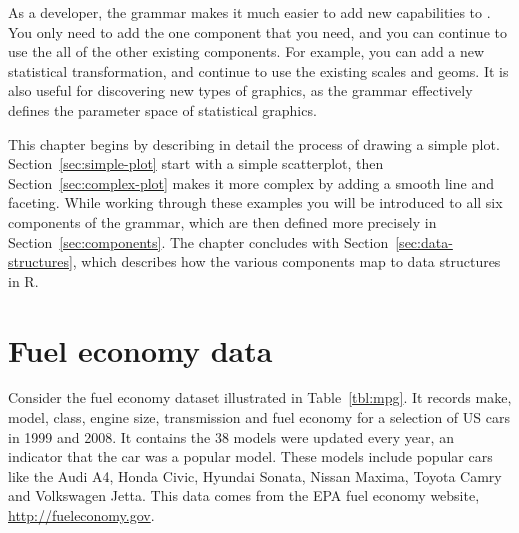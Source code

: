 As a developer, the grammar makes it much easier to add new capabilities to \ggplot. You only need to add the one component that you need, and you can continue to use the all of the other existing components.  For example, you can add a new statistical transformation, and continue to use the existing scales and geoms.  It is also useful for discovering new types of graphics, as the grammar effectively defines the parameter space of statistical graphics.

This chapter begins by describing in detail the process of drawing a simple plot.  Section~\ref{sec:simple-plot} start with a simple scatterplot, then Section~\ref{sec:complex-plot} makes it more complex by adding a smooth line and faceting.  While working through these examples you will be introduced to all six components of the grammar, which are then defined more precisely in Section~\ref{sec:components}.  The chapter concludes with Section~\ref{sec:data-structures}, which describes how the various components map to data structures in R.  

\section{Fuel economy data}
\label{sec:fuel_economy_data}

Consider the fuel economy dataset illustrated in Table~\ref{tbl:mpg}. It records make, model, class, engine size, transmission and fuel economy for a selection of US cars in 1999 and 2008. It contains the 38 models were updated every year, an indicator that the car was a popular model. These models include popular cars like the Audi A4, Honda Civic, Hyundai Sonata, Nissan Maxima, Toyota Camry and Volkswagen Jetta. This data comes from the EPA fuel economy website, \url{http://fueleconomy.gov}.

